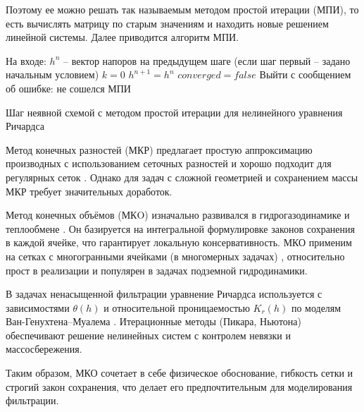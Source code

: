 \documentclass[a4paper,12pt]{article}
\begin{document}
 Поэтому ее можно решать так называемым методом простой итерации (МПИ), то есть вычислять матрицу по старым значениям и находить новые решением линейной системы. Далее приводится алгоритм МПИ.
 
 	\begin{algorithm}[H]\label{alg:time_step_richards}
 	\SetAlgoLined
 	На входе: $h^n$ -- вектор напоров на предыдущем шаге (если шаг первый -- задано начальным условием)\;
 	$k = 0$\;
 	$h^{n+1} = h^n$\;
 	$converged = false$\;
 	{
 		Выйти с сообщением об ошибке: не сошелся МПИ\;
 	}
 	\caption{Шаг неявной схемой с методом простой итерации для нелинейного уравнения Ричардса}
 \end{algorithm}

Метод конечных разностей (МКР) предлагает простую аппроксимацию производных с использованием сеточных разностей и хорошо подходит для регулярных сеток \cite{Samarskii1989}. Однако для задач с сложной геометрией и сохранением массы МКР требует значительных доработок. 

Метод конечных объёмов (МКO) изначально развивался в гидрогазодинамике и теплообмене \cite{Bear1972}. Он базируется на интегральной формулировке законов сохранения в каждой ячейке, что гарантирует локальную консервативность. МКО применим на сетках с многогранными ячейками (в многомерных задачах) \cite{Leontiev2017}, относительно прост в реализации и популярен в задачах подземной гидродинамики.

В задачах ненасыщенной фильтрации уравнение Ричардса используется с зависимостями $\theta(h)$ и относительной проницаемостью $K_r(h)$ по моделям Ван-Генухтена–Муалема \cite{VanGenuchten1980,Celia1990}. Итерационные методы (Пикара, Ньютона) обеспечивают решение нелинейных систем с контролем невязки и массосбережения.

Таким образом, МКО сочетает в себе физическое обоснование, гибкость сетки и строгий закон сохранения, что делает его предпочтительным для моделирования фильтрации.

\end{document}
